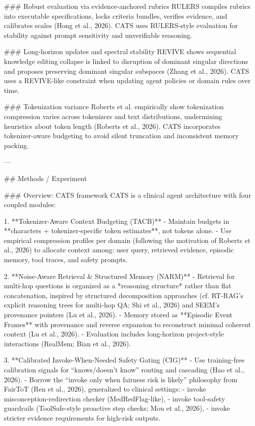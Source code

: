 ### Robust evaluation via evidence-anchored rubrics  
RULERS compiles rubrics into executable specifications, locks criteria bundles, verifies evidence, and calibrates scales (Hong et al., 2026). CATS uses RULERS-style evaluation for stability against prompt sensitivity and unverifiable reasoning.

### Long-horizon updates and spectral stability  
REVIVE shows sequential knowledge editing collapse is linked to disruption of dominant singular directions and proposes preserving dominant singular subspaces (Zhang et al., 2026). CATS uses a REVIVE-like constraint when updating agent policies or domain rules over time.

### Tokenization variance  
Roberts et al. empirically show tokenization compression varies across tokenizers and text distributions, undermining heuristics about token length (Roberts et al., 2026). CATS incorporates tokenizer-aware budgeting to avoid silent truncation and inconsistent memory packing.

---

## Methods / Experiment  

### Overview: CATS framework  
CATS is a clinical agent architecture with four coupled modules:

1. **Tokenizer-Aware Context Budgeting (TACB)**  
   - Maintain budgets in **characters + tokenizer-specific token estimates**, not tokens alone.  
   - Use empirical compression profiles per domain (following the motivation of Roberts et al., 2026) to allocate context among: user query, retrieved evidence, episodic memory, tool traces, and safety prompts.

2. **Noise-Aware Retrieval & Structured Memory (NARM)**  
   - Retrieval for multi-hop questions is organized as a *reasoning structure* rather than flat concatenation, inspired by structured decomposition approaches (cf. RT-RAG’s explicit reasoning trees for multi-hop QA; Shi et al., 2026) and SEEM’s provenance pointers (Lu et al., 2026).  
   - Memory stored as **Episodic Event Frames** with provenance and reverse expansion to reconstruct minimal coherent context (Lu et al., 2026).  
   - Evaluation includes long-horizon project-style interactions (RealMem; Bian et al., 2026).

3. **Calibrated Invoke-When-Needed Safety Gating (CIG)**  
   - Use training-free calibration signals for “knows/doesn’t know” routing and cascading (Hao et al., 2026).  
   - Borrow the “invoke only when fairness risk is likely” philosophy from FairToT (Ren et al., 2026), generalized to clinical settings:
     - invoke misconception-redirection checker (MedRedFlag-like),
     - invoke tool-safety guardrails (ToolSafe-style proactive step checks; Mou et al., 2026),
     - invoke stricter evidence requirements for high-risk outputs.


